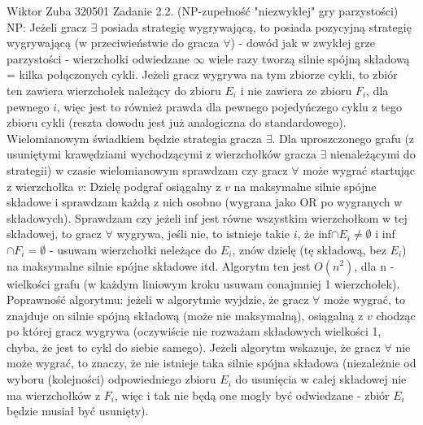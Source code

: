 \documentclass{article}
\begin{document}
Wiktor Zuba 320501
\newline
Zadanie 2.2. (NP-zupełność "niezwykłej" gry parzystości)
\newline
\newline
NP:\newline
Jeżeli gracz $\exists$ posiada strategię wygrywającą, to posiada pozycyjną strategię wygrywającą (w przeciwieństwie do gracza $\forall$) -
dowód jak w zwykłej grze parzystości - wierzchołki odwiedzane $\infty$ wiele razy tworzą silnie spójną składową = kilka połączonych cykli.
Jeżeli gracz wygrywa na tym zbiorze cykli, to zbiór ten zawiera wierzchołek należący do zbioru $E_i$ i nie zawiera ze zbioru $F_i$, dla pewnego $i$,
więc jest to również prawda dla pewnego pojedyńczego cyklu z tego zbioru cykli (reszta dowodu jest już analogiczna do standardowego).\newline 
Wielomianowym świadkiem będzie strategia gracza $\exists$.\newline
Dla uproszczonego grafu (z usuniętymi krawędziami wychodzącymi z wierzchołków gracza $\exists$ nienależącymi do strategii)
w czasie wielomianowym sprawdzam czy gracz $\forall$ może wygrać startując z wierzchołka $v$:\newline
Dzielę podgraf osiągalny z $v$ na maksymalne silnie spójne składowe i sprawdzam każdą z nich osobno (wygrana jako OR po wygranych w składowych).\newline
Sprawdzam czy jeżeli inf jest równe wszystkim wierzchołkom w tej składowej, to gracz $\forall$ wygrywa, jeśli nie, to istnieje takie $i$, że
inf$\cap E_i\neq\emptyset$ i inf$\cap F_i=\emptyset$ - usuwam wierzchołki neleżące do $E_i$, znów dzielę (tę składową, bez $E_i$)
na maksymalne silnie spójne składowe itd. Algorytm ten jest $O(n^2)$, dla n - wielkości grafu (w każdym liniowym kroku usuwam conajmniej 1 wierzchołek).\newline
Poprawność algorytmu: jeżeli w algorytmie wyjdzie, że gracz $\forall$ może wygrać, to znajduje on silnie spójną składową (może nie maksymalną),
osiągalną z $v$ chodząc po której gracz wygrywa (oczywiście nie rozważam składowych wielkości 1, chyba, że jest to cykl do siebie samego).
Jeżeli algorytm wskazuje, że gracz $\forall$ nie może wygrać, to znaczy, że nie istnieje taka silnie spójna składowa
(niezależnie od wyboru (kolejności) odpowiedniego zbioru $E_i$ do usunięcia w całej składowej nie ma wierzchołków z $F_i$,
więc i tak nie będą one mogły być odwiedzane - zbiór $E_i$ będzie musiał być usunięty).\newline\newline
\end{document}
